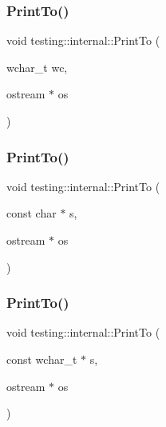 \mbox{\label{namespacetesting_1_1internal_aa74ea9d64f76ce69eceb225ca5ebef58}} 
\subsubsection{\texorpdfstring{PrintTo()}{PrintTo()}\hspace{0.1cm}{\footnotesize\ttfamily [1/23]}}
{\footnotesize\ttfamily void testing\+::internal\+::\+Print\+To (\begin{DoxyParamCaption}\item[{wchar\+\_\+t}]{wc,  }\item[{ostream $\ast$}]{os }\end{DoxyParamCaption})}

\mbox{\label{namespacetesting_1_1internal_adc6c98306d40b53fd07be4e295102a0a}} 
\subsubsection{\texorpdfstring{PrintTo()}{PrintTo()}\hspace{0.1cm}{\footnotesize\ttfamily [2/23]}}
{\footnotesize\ttfamily void testing\+::internal\+::\+Print\+To (\begin{DoxyParamCaption}\item[{const char $\ast$}]{s,  }\item[{ostream $\ast$}]{os }\end{DoxyParamCaption})}

\mbox{\label{namespacetesting_1_1internal_afc20fb56b2547a8f91f9ff99650f2024}} 
\subsubsection{\texorpdfstring{PrintTo()}{PrintTo()}\hspace{0.1cm}{\footnotesize\ttfamily [3/23]}}
{\footnotesize\ttfamily void testing\+::internal\+::\+Print\+To (\begin{DoxyParamCaption}\item[{const wchar\+\_\+t $\ast$}]{s,  }\item[{ostream $\ast$}]{os }\end{DoxyParamCaption})}

